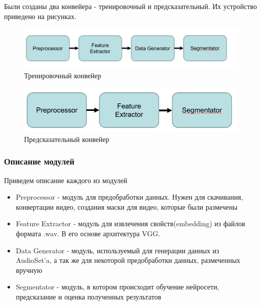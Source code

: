 \documentclass[main.tex]{subfiles}
\begin{document}
Были созданы два конвейера - тренировочный и предсказательный. Их устройство приведено на рисунках.
\begin{figure}[H]
	\begin{center}
		\includegraphics[scale=0.7]{images/train.png}
		\caption{Тренировочный конвейер}
	\end{center}
\end{figure}

\begin{figure}[H]
	\begin{center}
		\includegraphics[scale=0.7]{images/predict.png}
		\caption{Предсказательный конвейер}
	\end{center}
\end{figure}

\subsubsection{Описание модулей}
Приведем описание каждого из модулей
\begin{itemize}
    \item Preprocessor - модуль для предобработки данных. Нужен для скачивания, конвертации видео, создания маски для видео, которые были размечены
    \item Feature Extractor - модуль для извлечения свойств(embedding) из файлов формата  .wav. В его основе архитектура VGG.
    \item Data Generator - модуль, используемый для генерации данных из AudioSet'a, а так же для некоторой предобработки данных, размеченных вручную
    \item Segmentator - модуль, в котором происходит обучение нейросети, предсказание и оценка полученных результатов
\end{itemize}
\end{document}
